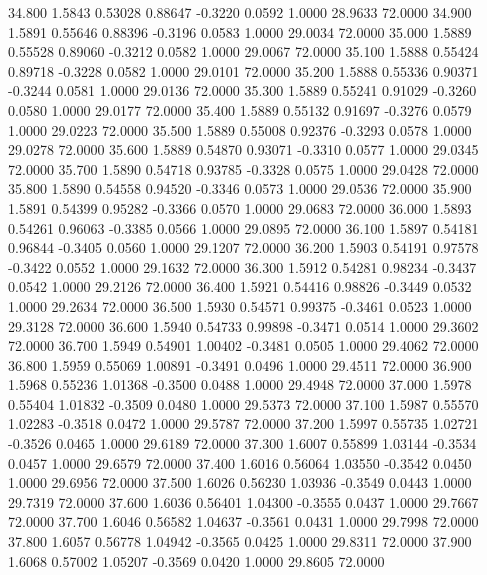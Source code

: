   34.800   1.5843   0.53028   0.88647  -0.3220   0.0592   1.0000  28.9633  72.0000
  34.900   1.5891   0.55646   0.88396  -0.3196   0.0583   1.0000  29.0034  72.0000
  35.000   1.5889   0.55528   0.89060  -0.3212   0.0582   1.0000  29.0067  72.0000
  35.100   1.5888   0.55424   0.89718  -0.3228   0.0582   1.0000  29.0101  72.0000
  35.200   1.5888   0.55336   0.90371  -0.3244   0.0581   1.0000  29.0136  72.0000
  35.300   1.5889   0.55241   0.91029  -0.3260   0.0580   1.0000  29.0177  72.0000
  35.400   1.5889   0.55132   0.91697  -0.3276   0.0579   1.0000  29.0223  72.0000
  35.500   1.5889   0.55008   0.92376  -0.3293   0.0578   1.0000  29.0278  72.0000
  35.600   1.5889   0.54870   0.93071  -0.3310   0.0577   1.0000  29.0345  72.0000
  35.700   1.5890   0.54718   0.93785  -0.3328   0.0575   1.0000  29.0428  72.0000
  35.800   1.5890   0.54558   0.94520  -0.3346   0.0573   1.0000  29.0536  72.0000
  35.900   1.5891   0.54399   0.95282  -0.3366   0.0570   1.0000  29.0683  72.0000
  36.000   1.5893   0.54261   0.96063  -0.3385   0.0566   1.0000  29.0895  72.0000
  36.100   1.5897   0.54181   0.96844  -0.3405   0.0560   1.0000  29.1207  72.0000
  36.200   1.5903   0.54191   0.97578  -0.3422   0.0552   1.0000  29.1632  72.0000
  36.300   1.5912   0.54281   0.98234  -0.3437   0.0542   1.0000  29.2126  72.0000
  36.400   1.5921   0.54416   0.98826  -0.3449   0.0532   1.0000  29.2634  72.0000
  36.500   1.5930   0.54571   0.99375  -0.3461   0.0523   1.0000  29.3128  72.0000
  36.600   1.5940   0.54733   0.99898  -0.3471   0.0514   1.0000  29.3602  72.0000
  36.700   1.5949   0.54901   1.00402  -0.3481   0.0505   1.0000  29.4062  72.0000
  36.800   1.5959   0.55069   1.00891  -0.3491   0.0496   1.0000  29.4511  72.0000
  36.900   1.5968   0.55236   1.01368  -0.3500   0.0488   1.0000  29.4948  72.0000
  37.000   1.5978   0.55404   1.01832  -0.3509   0.0480   1.0000  29.5373  72.0000
  37.100   1.5987   0.55570   1.02283  -0.3518   0.0472   1.0000  29.5787  72.0000
  37.200   1.5997   0.55735   1.02721  -0.3526   0.0465   1.0000  29.6189  72.0000
  37.300   1.6007   0.55899   1.03144  -0.3534   0.0457   1.0000  29.6579  72.0000
  37.400   1.6016   0.56064   1.03550  -0.3542   0.0450   1.0000  29.6956  72.0000
  37.500   1.6026   0.56230   1.03936  -0.3549   0.0443   1.0000  29.7319  72.0000
  37.600   1.6036   0.56401   1.04300  -0.3555   0.0437   1.0000  29.7667  72.0000
  37.700   1.6046   0.56582   1.04637  -0.3561   0.0431   1.0000  29.7998  72.0000
  37.800   1.6057   0.56778   1.04942  -0.3565   0.0425   1.0000  29.8311  72.0000
  37.900   1.6068   0.57002   1.05207  -0.3569   0.0420   1.0000  29.8605  72.0000
